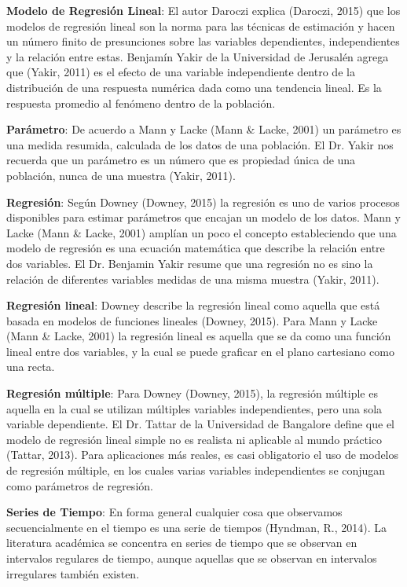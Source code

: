 \textbf{Modelo de Regresión Lineal}: El autor Daroczi explica (Daroczi, 2015) que los modelos de regresión lineal son la norma para las técnicas de estimación y hacen un número finito de presunciones sobre las variables dependientes, independientes y la relación entre estas. Benjamín Yakir de la Universidad de Jerusalén agrega que (Yakir, 2011) es el efecto de una variable independiente dentro de la distribución de una respuesta numérica dada como una tendencia lineal. Es la respuesta promedio al fenómeno dentro de la población.
 
\textbf{Parámetro}: De acuerdo a Mann y Lacke (Mann \& Lacke, 2001) un parámetro es una medida resumida, calculada de los datos de una población. El Dr. Yakir nos recuerda que un parámetro es un número que es propiedad única de una población, nunca de una muestra (Yakir, 2011).
 
\textbf{Regresión}: Según Downey (Downey, 2015) la regresión es uno de varios procesos disponibles para estimar parámetros que encajan un modelo de los datos. Mann y Lacke (Mann \& Lacke, 2001) amplían un poco el concepto estableciendo que una modelo de regresión es una ecuación matemática que describe la relación entre dos variables. El Dr. Benjamin Yakir resume que una regresión no es sino la relación de diferentes variables medidas de una misma muestra (Yakir, 2011).
 
\textbf{Regresión lineal}: Downey describe la regresión lineal como aquella que está basada en modelos de funciones lineales (Downey, 2015). Para Mann y Lacke (Mann \& Lacke, 2001) la regresión lineal es aquella que se da como una función lineal entre dos variables, y la cual se puede graficar en el plano cartesiano como una recta.
 
\textbf{Regresión múltiple}: Para Downey (Downey, 2015), la regresión múltiple es aquella en la cual se utilizan múltiples variables independientes, pero una sola variable dependiente. El Dr. Tattar de la Universidad de Bangalore define que el modelo de regresión lineal simple no es realista ni aplicable al mundo práctico (Tattar, 2013). Para aplicaciones más reales, es casi obligatorio el uso de modelos de regresión múltiple, en los cuales varias variables independientes se conjugan como parámetros de regresión.
 
\textbf{Series de Tiempo}: En forma general cualquier cosa que observamos secuencialmente en el tiempo es una serie de tiempos (Hyndman, R., 2014). La literatura académica se concentra en series de tiempo que se observan en intervalos regulares de tiempo, aunque aquellas que se observan en intervalos irregulares también existen.

